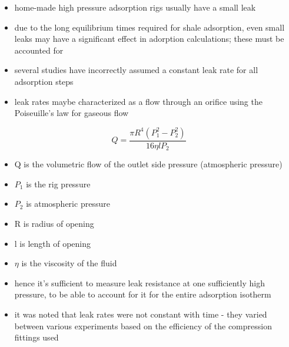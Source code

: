 \documentclass[11pt]{article}
\begin{document}
\begin{enumerate}
\label{sec:org17226bb}
\begin{itemize}
\item home-made high pressure adsorption rigs usually have a small leak
\item due to the long equilibrium times required for shale adsorption, even small leaks may have a significant effect in adorption calculations; these must be accounted for
\item several studies have incorrectly assumed a constant leak rate for all adsorption steps
\item leak rates maybe characterized as a flow through an orifice using the Poiseuille's law for gaseous flow \cite{Bomelburg1977}
\end{itemize}
\begin{equation}
Q = \frac{\pi R^4 (P_1 ^2 - P_2 ^2)}{16 \eta l P_2}
\end{equation}
\begin{itemize}
\item Q is the volumetric flow of the outlet side pressure (atmospheric pressure)
\item \(P_1\) is the rig pressure
\item \(P_2\) is atmospheric pressure
\item R is radius of opening
\item l is length of opening
\item \(\eta\) is the viscosity of the fluid
\item hence it's sufficient to measure leak resistance at one sufficiently high pressure, to be able to account for it for the entire adsorption isotherm
\item it was noted that leak rates were not constant with time - they varied between various experiments based on the efficiency of the compression fittings used
\end{itemize}
\end{enumerate}
\end{document}
